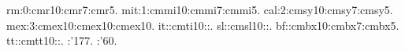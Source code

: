 \newfont rm:0:cmr10:cmr7:cmr5.
\newmathfont mit:1:cmmi10:cmmi7:cmmi5.
\newmathfont cal:2:cmsy10:cmsy7:cmsy5.
\newmathfont mex:3:cmex10:cmex10:cmex10.
\newfam\itfam \newfam\slfam \newfam\bffam \newfam\ttfam
\newfont it:\itfam:cmti10::.
\newfont sl:\slfam:cmsl10::.
\newfont bf:\bffam:cmbx10:cmbx7:cmbx5.
\newfont tt:\ttfam:cmtt10::.
:'177.
:'60.
\rm
